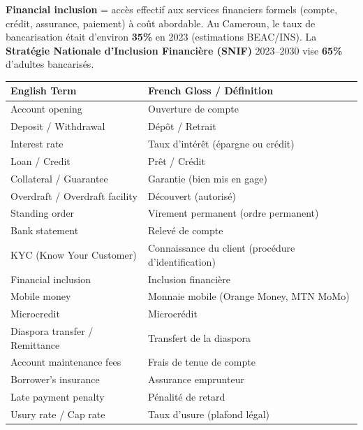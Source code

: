 \documentclass[11pt]{article}
\newcommand{\cle}[1]{{\popxbold\color{popdark}#1}}
\begin{document}
\begin{definition}
\textbf{Financial inclusion} = accès effectif aux services financiers formels (compte, crédit, assurance, paiement) à coût abordable. Au Cameroun, le taux de bancarisation était d'environ \textbf{35\%} en 2023 (estimations BEAC/INS). La \textbf{Stratégie Nationale d'Inclusion Financière (SNIF)} 2023--2030 vise \textbf{65\%} d'adultes bancarisés.
\end{definition}

\begin{center}
\begin{tabularx}{\linewidth}{|l|X|}\hline
\rowcolor{popblueL}
\textbf{English Term} & \textbf{French Gloss / Définition} \\ \hline
\cle{Account opening} & Ouverture de compte \\ \hline
\cle{Deposit} / \cle{Withdrawal} & Dépôt / Retrait \\ \hline
\cle{Interest rate} & Taux d'intérêt (épargne ou crédit) \\ \hline
\cle{Loan} / \cle{Credit} & Prêt / Crédit \\ \hline
\cle{Collateral} / \cle{Guarantee} & Garantie (bien mis en gage) \\ \hline
\cle{Overdraft} / \cle{Overdraft facility} & Découvert (autorisé) \\ \hline
\cle{Standing order} & Virement permanent (ordre permanent) \\ \hline
\cle{Bank statement} & Relevé de compte \\ \hline
\cle{KYC (Know Your Customer)} & Connaissance du client (procédure d'identification) \\ \hline
\cle{Financial inclusion} & Inclusion financière \\ \hline
\cle{Mobile money} & Monnaie mobile (Orange Money, MTN MoMo) \\ \hline
\cle{Microcredit} & Microcrédit \\ \hline
\cle{Diaspora transfer / Remittance} & Transfert de la diaspora \\ \hline
\cle{Account maintenance fees} & Frais de tenue de compte \\ \hline
\cle{Borrower's insurance} & Assurance emprunteur \\ \hline
\cle{Late payment penalty} & Pénalité de retard \\ \hline
\cle{Usury rate / Cap rate} & Taux d'usure (plafond légal) \\ \hline
\end{tabularx}
\end{center}
\end{document}
